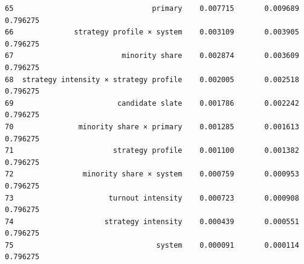\documentclass[11pt]{article}
\begin{document}
\begin{tcolorbox}[breakable, size=fbox, boxrule=.5pt, pad at break*=1mm, opacityfill=0]
\begin{Verbatim}[commandchars=\\\{\}]
65                                primary    0.007715       0.009689  0.796275
66              strategy profile × system    0.003109       0.003905  0.796275
67                         minority share    0.002874       0.003609  0.796275
68  strategy intensity × strategy profile    0.002005       0.002518  0.796275
69                        candidate slate    0.001786       0.002242  0.796275
70               minority share × primary    0.001285       0.001613  0.796275
71                       strategy profile    0.001100       0.001382  0.796275
72                minority share × system    0.000759       0.000953  0.796275
73                      turnout intensity    0.000723       0.000908  0.796275
74                     strategy intensity    0.000439       0.000551  0.796275
75                                 system    0.000091       0.000114  0.796275
\end{Verbatim}
\end{tcolorbox}
        
\end{document}
